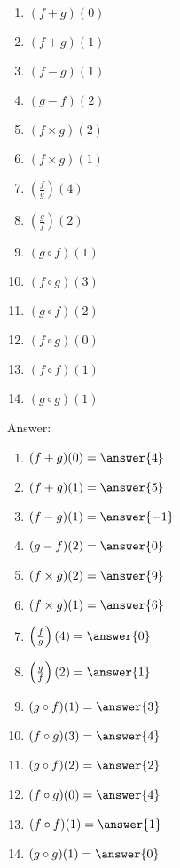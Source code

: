 \documentclass{ximera}
\begin{document}
\begin{exercise}
\begin{enumerate}
\item  $(f+g)(0)$ \label{twofuncgraphsfirst}
\item  $(f+g)(1)$
\item  $(f-g)(1)$
\item  $(g-f)(2)$
\item  $(f\times g)(2)$
\item  $(f\times g)(1)$
\item  $\left(\frac{f}{g}\right)(4)$
\item  $\left(\frac{g}{f}\right)(2)$ \label{twofuncgraphslast}
\item  $(g\circ f)(1)$ \label{twofuncgraphcompfirst}
\item  $(f \circ g)(3)$
\item  $(g\circ f)(2)$
\item  $(f\circ g)(0)$  
\item  $(f\circ f)(1)$
\item  $(g \circ g)(1)$
\end{enumerate}

Answer:

\begin{enumerate}
\item  $(f+g)(0)=\answer{4}$
\item  $(f+g)(1)=\answer{5}$
\item  $(f-g)(1)=\answer{-1}$
\item  $(g-f)(2)=\answer{0}$
\item  $(f\times g)(2)=\answer{9}$
\item  $(f\times g)(1)=\answer{6}$
\item  $\left(\frac{f}{g}\right)(4)=\answer{0}$
\item  $\left(\frac{g}{f}\right)(2)=\answer{1}$
\item  $(g\circ f)(1)=\answer{3}$ 
\item  $(f \circ g)(3)=\answer{4}$
\item  $(g\circ f)(2)=\answer{2}$
\item  $(f\circ g)(0)=\answer{4}$  
\item  $(f\circ f)(1)=\answer{1}$
\item  $(g \circ g)(1)=\answer{0}$
\end{enumerate}

\end{exercise}
\end{document}
